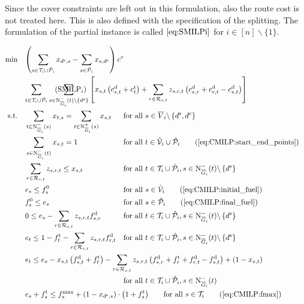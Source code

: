 Since the cover constraints are left out in this formulation, also the route cost is not treated here. This is also defined with the specification of the splitting. The formulation of the partial instance is called $\eqref{eq:SMILPi}$ for $i\in[n]\backslash\{1\}$.

\newpage

\begin{align}
	\min \quad & \omit\rlap{$\displaystyle{\left(\sum_{s\in\Ti\cup\Phat_i} x_{\ds,s} - \sum_{s\in\Phat_i} x_{s,\de}\right)\cv}$} \nonumber \\
	& \omit\rlap{$\displaystyle{\sum_{t\in\Ti\cup\Phat_i}\sum_{s\in\Ninoi(t)\backslash\left\{\ds\right\}}\left[x_{s,t}\left(\cd_{s,t}+\ct_t\right)+\sum_{r\in\Rst}z_{s,r,t}\left(\cd_{s,r}+\cd_{r,t}-\cd_{s,t}\right)\right]}$} \tag{$\operatorname{SMILP}_i$} \label{eq:SMILPi} \\
	\text{s.t.} \quad & \sum_{t\in\Ninoi(s)} x_{t,s} = \sum_{t\in\Noutoi(s)} x_{s,t} & & \text{for all } s\in \overline{V}_i\backslash\left\{\ds,\de\right\} \label{eq:CMILP:flow} \\
	& \sum_{s\in\Ninoi(t)} x_{s,t} = 1 && \text{for all } t\in\Vhat_i\cup\Phat_i \tag{\ref{eq:CMILP:start_end_points}} \\	
	& \sum_{r\in\Rst} z_{s,r,t} \leq x_{s,t} && \text{for all } t\in\Ti\cup\Phat_i, s\in\Ninoi(t)\backslash\left\{\ds\right\} \label{eq:CMILP:refuel} \\
	& e_s \leq f_s^0 & & \text{for all } s\in\Vhat_i \tag{\ref{eq:CMILP:initial_fuel}} \\
	& f^0_s \leq e_s && \text{for all } s\in\Phat_i \tag{\ref{eq:CMILP:final_fuel}} \\
	& 0 \leq e_s - \sum_{r\in\Rst} z_{s,r,t}\fd_{s,r} & & \text{for all } t\in\Ti\cup\Phat_i, s\in\Ninoi(t)\backslash\left\{\ds\right\} \label{eq:CMILP:min_fuel} \\
	& e_t \leq 1 - \ft_t - \sum_{r\in\Rst} z_{s,r,t}\fd_{r,t} & & \text{for all } t\in\Ti\cup\Phat_i, s\in\Ninoi(t)\backslash\left\{\ds\right\} \label{eq:CMILP:max_fuel} \\
	& \omit\rlap{$\displaystyle{e_t \leq e_s - x_{s,t}\left(f_{s,t}^{\operatorname{d}}+f_t^{\operatorname{t}}\right) - \sum_{r\in\Rst} z_{s,r,t}\left(\fd_{s,r}+\ft_r+\fd_{r,t}-\fd_{s,t}\right) + \left(1-x_{s,t}\right)}$} \nonumber \\
	& & & \text{for all } t\in\Ti\cup\Phat_i, s\in\Ninoi(t) \label{eq:CMILP:fuel_consumption} \\
	& \omit\rlap{$\displaystyle{e_s + \ft_s \leq f^{\max}_s + \left(1-x_{\ds,s}\right)\cdot\left(1+\ft_s\right)} \qquad \text{for all } s\in\Ti \tag{\ref{eq:CMILP:fmax}}$} \\

\end{align}
